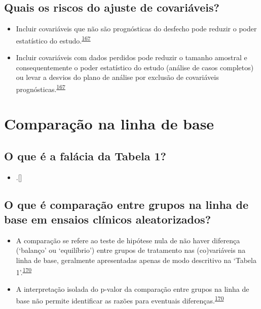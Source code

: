\documentclass[
  a4paper,
]{book}
\providecommand{\tightlist}{%
  \setlength{\itemsep}{0pt}\setlength{\parskip}{0pt}}
\begin{document}
\hypertarget{quais-os-riscos-do-ajuste-de-covariuxe1veis}{%
\subsection{Quais os riscos do ajuste de covariáveis?}\label{quais-os-riscos-do-ajuste-de-covariuxe1veis}}

\begin{itemize}
\item
  Incluir covariáveis que não são prognósticas do desfecho pode reduzir o poder estatístico do estudo.\textsuperscript{\protect\hyperlink{ref-Kahan2014}{167}}
\item
  Incluir covariáveis com dados perdidos pode reduzir o tamanho amostral e consequentemente o poder estatístico do estudo (análise de casos completos) ou levar a desvios do plano de análise por exclusão de covariáveis prognósticas.\textsuperscript{\protect\hyperlink{ref-Kahan2014}{167}}
\end{itemize}

\hypertarget{comparacao-linha-de-base}{%
\section{Comparação na linha de base}\label{comparacao-linha-de-base}}

\hypertarget{o-que-uxe9-a-faluxe1cia-da-tabela-1}{%
\subsection{O que é a falácia da Tabela 1?}\label{o-que-uxe9-a-faluxe1cia-da-tabela-1}}

\begin{itemize}
\tightlist
\item
  .{[}{]}
\end{itemize}

\hypertarget{o-que-uxe9-comparauxe7uxe3o-entre-grupos-na-linha-de-base-em-ensaios-cluxednicos-aleatorizados}{%
\subsection{O que é comparação entre grupos na linha de base em ensaios clínicos aleatorizados?}\label{o-que-uxe9-comparauxe7uxe3o-entre-grupos-na-linha-de-base-em-ensaios-cluxednicos-aleatorizados}}

\begin{itemize}
\item
  A comparação se refere ao teste de hipótese nula de não haver diferença (`balanço' ou `equilíbrio') entre grupos de tratamento nas (co)variáveis na linha de base, geralmente apresentadas apenas de modo descritivo na `Tabela 1'.\textsuperscript{\protect\hyperlink{ref-Stang2018}{170}}
\item
  A interpretação isolada do p-valor da comparação entre grupos na linha de base não permite identificar as razões para eventuais diferenças.\textsuperscript{\protect\hyperlink{ref-Stang2018}{170}}
\end{itemize}
\end{document}
